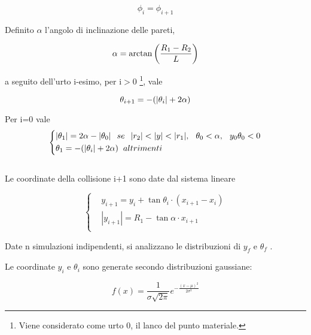 \documentclass{article}
\begin{document}
\begin{equation}
    \phi_i=\phi_{i+1}
\end{equation}

Definito \(\alpha\) l'angolo di inclinazione delle pareti,

\begin{equation}
\alpha=\arctan{\left(\frac{R_1-R_2}{L}\right)}\\
\end{equation}

a seguito dell'urto i-esimo, per i$>$0 \footnote{Viene considerato come urto 0, il lanco del punto materiale.}, vale

\begin{equation}
\centering
\theta_{i+1}=-(|\theta_{i}|+2\alpha) 
\end{equation}

Per i=0 vale\\
\begin{equation}
\left\{
\begin{aligned}
    & |\theta_1|=2\alpha-|\theta_0| \hspace{2.5 mm} se\hspace{2.5 mm}|r_2|<|y|<|r_1|,\hspace{2.5 mm} \theta_0<\alpha ,\hspace{2.5 mm}  y_0\theta_0<0  \\
    & \theta_1=-(|\theta_i|+2\alpha) \hspace{2.0mm} altrimenti
\end{aligned}
\right.
\end{equation}\\

Le coordinate della collisione i+1 sono date dal sistema lineare

\begin{equation}
\left\{
\begin{aligned}
   & y_{i+1}=y_i+\tan\theta_i \cdot (x_{i+1}-x_i) \\
   & |y_{i+1}|= R_1 - \tan\alpha \cdot x_{i+1}
\\
\end{aligned}
\right.
\end{equation}


Date n simulazioni indipendenti, si analizzano le distribuzioni di $y_f$ e $\theta_f$ .

Le coordinate $y_i$ e $\theta_i$ sono generate secondo distribuzioni gaussiane:

\begin{equation}
    f(x) = \frac{1}{\sigma\sqrt{2\pi}} e^{-\frac{(x-\mu)^2}{2\sigma^2}}
\end{equation}
\end{document}
